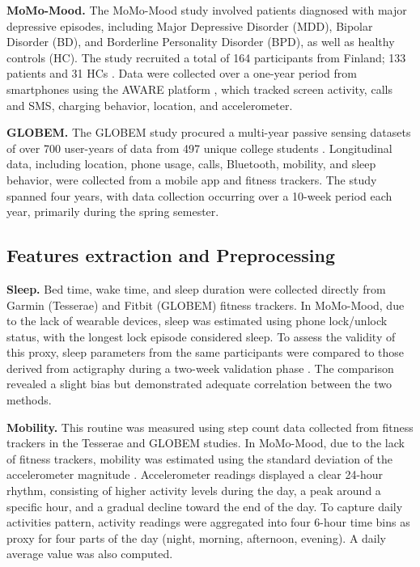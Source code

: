 \documentclass[pdflatex,sn-vancouver,Numbered]{bst/sn-jnl}%
\theoremstyle{thmstyleone}%
\theoremstyle{thmstyletwo}%
\theoremstyle{thmstylethree}%
\begin{document}
\textbf{MoMo-Mood.} The MoMo-Mood study involved patients diagnosed with major depressive episodes, including Major Depressive Disorder (MDD), Bipolar Disorder (BD), and Borderline Personality Disorder (BPD), as well as healthy controls (HC). The study recruited a total of 164 participants from Finland; 133 patients and 31 HCs \cite{aledavood2025multimodal}. Data were collected over a one-year period from smartphones using the AWARE platform \cite{ferreiraAWAREMobileContext2015}, which tracked screen activity, calls and SMS, charging behavior, location, and accelerometer.

\textbf{GLOBEM.} The GLOBEM study procured a multi-year passive sensing datasets of over 700 user-years of data from 497 unique college students \cite{xu2022globem}. Longitudinal data, including location, phone usage, calls, Bluetooth, mobility, and sleep behavior, were collected from a mobile app and fitness trackers. The study spanned four years, with data collection occurring over a 10-week period each year, primarily during the spring semester. 

\subsection*{Features extraction and Preprocessing} \label{sec:methods:features_extraction}  

\textbf{Sleep.} Bed time, wake time, and sleep duration were collected directly from Garmin (Tesserae) and Fitbit (GLOBEM) fitness trackers. In MoMo-Mood, due to the lack of wearable devices, sleep was estimated using phone lock/unlock status, with the longest lock episode considered sleep. To assess the validity of this proxy, sleep parameters from the same participants were compared to those derived from actigraphy during a two-week validation phase . The comparison revealed a slight bias but demonstrated adequate correlation between the two methods.

\textbf{Mobility.} This routine was measured using step count data collected from fitness trackers in the Tesserae and GLOBEM studies. In MoMo-Mood, due to the lack of fitness trackers, mobility was estimated using the standard deviation of the accelerometer magnitude \cite{ravi2005activity}. Accelerometer readings displayed a clear 24-hour rhythm, consisting of higher activity levels during the day, a peak around a specific hour, and a gradual decline toward the end of the day. To capture daily activities pattern, activity readings were aggregated into four 6-hour time bins as proxy for four parts of the day (night, morning, afternoon, evening). A daily average value was also computed.
\end{document}

